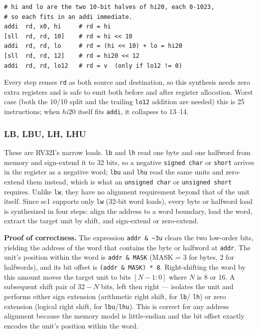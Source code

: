 \begin{lstlisting}
# hi and lo are the two 10-bit halves of hi20, each 0-1023,
# so each fits in an addi immediate.
addi  rd, x0, hi     # rd = hi
[sll  rd, rd, 10]    # rd = hi << 10
addi  rd, rd, lo     # rd = (hi << 10) + lo = hi20
[sll  rd, rd, 12]    # rd = hi20 << 12
addi  rd, rd, lo12   # rd = v  (only if lo12 != 0)
\end{lstlisting}

Every step reuses \texttt{rd} as both source and destination, so this synthesis needs zero extra
registers and is safe to emit both before and after register allocation. Worst case (both the 10/10
split and the trailing \texttt{lo12} addition are needed) this is 25 instructions; when
$\mathit{hi20}$ itself fits \texttt{addi}, it collapses to 13--14.


\subsubsection{LB, LBU, LH, LHU} \label{sec:sc1-lb-synthesis}

These are RV32I's narrow loads. \texttt{lb} and \texttt{lh} read one byte and one halfword from
memory and sign-extend it to 32 bits, so a negative \texttt{signed char} or \texttt{short} arrives
in the register as a negative word; \texttt{lbu} and \texttt{lhu} read the same units and
zero-extend them instead, which is what an \texttt{unsigned char} or \texttt{unsigned short}
requires. Unlike \texttt{lw}, they have no alignment requirement beyond that of the unit itself.
Since sc1 supports only \texttt{lw} (32-bit word loads), every byte or halfword load is synthesized
in four steps: align the address to a word boundary, load the word, extract the target unit by shift,
and sign-extend or zero-extend.

\textbf{Proof of correctness.} The expression \texttt{addr \& \~{}3u} clears the two low-order bits,
yielding the address of the word that contains the byte or halfword at \texttt{addr}. The unit's
position within the word is \texttt{addr \& MASK} (MASK = 3 for bytes, 2 for halfwords), and its bit
offset is \texttt{(addr \& MASK) * 8}. Right-shifting the word by this amount moves the target unit
to bits $[N-1:0]$ where $N$ is 8 or 16. A subsequent shift pair of $32-N$ bits, left then right
--- isolates the unit and performs either sign extension (arithmetic right shift, for \texttt{lb}/
\texttt{lh}) or zero extension (logical right shift, for \texttt{lbu}/\texttt{lhu}). This is correct
for any address alignment because the memory model is little-endian and the bit offset exactly encodes
the unit's position within the word.

